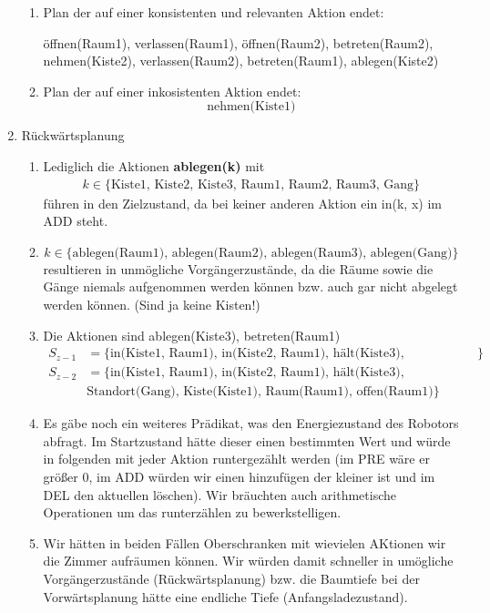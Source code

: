 \documentclass[a4paper,10pt]{article}
\begin{document}
\begin{enumerate}[~~a.)]
\begin{enumerate}[~~i)]
        \item Plan der auf einer konsistenten und relevanten Aktion endet:
        \begin{center}
         öffnen(Raum1), verlassen(Raum1), öffnen(Raum2), betreten(Raum2), \\
         nehmen(Kiste2), verlassen(Raum2), betreten(Raum1), ablegen(Kiste2)
        \end{center}
        \item Plan der auf einer inkosistenten Aktion endet:
        $$\textrm{nehmen(Kiste1)}$$
    \end{enumerate}
    \item Rückwärtsplanung
    \begin{enumerate}[~~i)]
    	\item Lediglich die Aktionen \textbf{ablegen(k)} mit
    	\begin{align*}
    	k \in \{\text{Kiste1, Kiste2, Kiste3, Raum1, Raum2, Raum3, Gang}\}
    	\end{align*}
    	führen in den Zielzustand, da bei keiner anderen Aktion ein in(k, x) im ADD steht. 
        \item $$k \in \{\text{ablegen(Raum1), ablegen(Raum2), ablegen(Raum3), ablegen(Gang)}\}$$
        resultieren in unmögliche Vorgängerzustände, da die Räume sowie die Gänge niemals aufgenommen werden können bzw. auch gar nicht abgelegt werden können. (Sind ja keine Kisten!)
        \item
        Die Aktionen sind ablegen(Kiste3), betreten(Raum1) 
        \begin{align*}
            S_{z-1} &= \{ \textrm{in(Kiste1, Raum1), in(Kiste2, Raum1), hält(Kiste3), Standort(Raum1), Kiste(Kiste1)}  \} \\
            S_{z-2} &= \{ \textrm{in(Kiste1, Raum1), in(Kiste2, Raum1), hält(Kiste3),} \\
                          &\textrm{Standort(Gang), Kiste(Kiste1), Raum(Raum1), offen(Raum1)}  \}
        \end{align*}
        \item Es gäbe noch ein weiteres Prädikat, was den Energiezustand des Robotors abfragt. Im Startzustand hätte dieser einen bestimmten Wert und würde in folgenden mit jeder Aktion runtergezählt werden (im PRE wäre er größer 0, im ADD würden wir einen hinzufügen der kleiner ist und im DEL den aktuellen löschen). Wir bräuchten auch arithmetische Operationen um das runterzählen zu bewerkstelligen.
        \item Wir hätten in beiden Fällen Oberschranken mit wievielen AKtionen wir die Zimmer aufräumen können. Wir würden damit schneller in umögliche Vorgängerzustände (Rückwärtsplanung) bzw. die Baumtiefe bei der Vorwärtsplanung hätte eine endliche Tiefe (Anfangsladezustand).

    \end{enumerate}
\end{enumerate}
\end{document}
